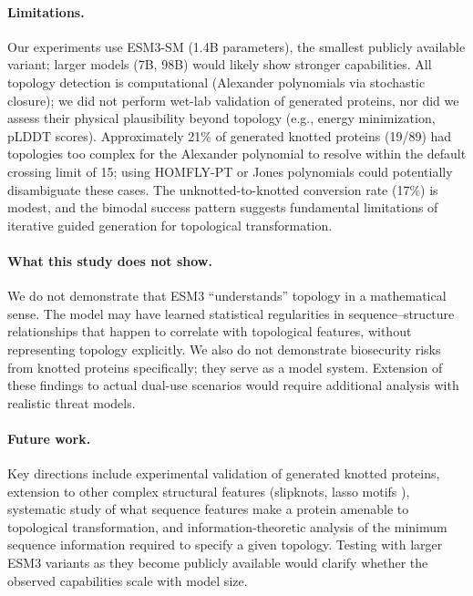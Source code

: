 \documentclass{article}
\begin{document}
\paragraph{Limitations.} Our experiments use ESM3-SM (1.4B parameters), the smallest publicly available variant; larger models (7B, 98B) would likely show stronger capabilities. All topology detection is computational (Alexander polynomials via stochastic closure); we did not perform wet-lab validation of generated proteins, nor did we assess their physical plausibility beyond topology (e.g., energy minimization, pLDDT scores). Approximately 21\% of generated knotted proteins (19/89) had topologies too complex for the Alexander polynomial to resolve within the default crossing limit of 15; using HOMFLY-PT or Jones polynomials could potentially disambiguate these cases. The unknotted-to-knotted conversion rate (17\%) is modest, and the bimodal success pattern suggests fundamental limitations of iterative guided generation for topological transformation.

\paragraph{What this study does not show.} We do not demonstrate that ESM3 ``understands'' topology in a mathematical sense. The model may have learned statistical regularities in sequence--structure relationships that happen to correlate with topological features, without representing topology explicitly. We also do not demonstrate biosecurity risks from knotted proteins specifically; they serve as a model system. Extension of these findings to actual dual-use scenarios would require additional analysis with realistic threat models.

\paragraph{Future work.} Key directions include experimental validation of generated knotted proteins, extension to other complex structural features (slipknots, lasso motifs \cite{dabrowski2019knotprot}), systematic study of what sequence features make a protein amenable to topological transformation, and information-theoretic analysis of the minimum sequence information required to specify a given topology. Testing with larger ESM3 variants as they become publicly available would clarify whether the observed capabilities scale with model size.

\end{document}
